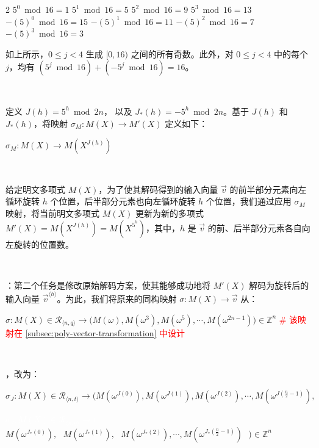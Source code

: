 \begin{multicols}{2}
\noindent $5^0 \bmod 16 = 1$
\newline $5^1 \bmod 16 = 5$
\newline $5^2 \bmod 16 = 9$
\newline $5^3 \bmod 16 = 13$
\newline $-(5)^0 \bmod 16 = 15$
\newline $-(5)^1 \bmod 16 = 11$
\newline $-(5)^2 \bmod 16 = 7$
\newline $-(5)^3 \bmod 16 = 3$
\end{multicols}


如上所示，$0 \leq j < 4$ 生成 $[0, 16)$ 之间的所有奇数。此外，对 $0 \leq j < 4$ 中的每个 $j$，均有 $(5^j \bmod 16) + (-5^j \bmod 16) = 16$。

$ $

定义 $J(h) = 5^h \bmod 2n$，\text{ } 以及 \text{ } $J_*(h) = -5^h \bmod 2n$。基于 $J(h)$ 和 $J_*(h)$，将映射 $\sigma_M : M(X) \rightarrow M'(X)$ 定义如下：

$\sigma_{M} : M(X) \rightarrow M(X^{J(h)})$

$ $

给定明文多项式 $M(X)$，为了使其解码得到的输入向量 $\vec{v}$ 的前半部分元素向左循环旋转 $h$ 个位置，后半部分元素也向左循环旋转 $h$ 个位置，我们通过应用 $\sigma_M$ 映射，将当前明文多项式 $M(X)$ 更新为新的多项式 $M'(X) = M(X^{J(h)}) = M(X^{5^h})$，其中，$h$ 是 $\vec{v}$ 的前、后半部分元素各自向左旋转的位置数。


$ $

：第二个任务是修改原始解码方案，使其能够成功地将 $M'(X)$ 解码为旋转后的输入向量 $\vec{v}^{\langle h \rangle}$。为此，我们将原来的同构映射 $\sigma : M(X) \longrightarrow \vec{v}$ 从：

$\sigma: M(X) \in \mathcal{R}_{\langle n, q \rangle} \longrightarrow  \bm{(}M(\omega), M(\omega^3),M(\omega^5), \cdots, M(\omega^{2n-1})\bm{)} \in \mathbb{Z}^n$ \textcolor{red}{ \text{ } \# 该映射在 \autoref{subsec:poly-vector-transformation} 中设计}

$ $

，改为：

$\sigma_J: M(X) \in \mathcal{R}_{\langle n, t \rangle} \longrightarrow  \bm{(}M(\omega^{J(0)}),M(\omega^{J(1)}),M(\omega^{J(2)}), \cdots, M(\omega^{J(\frac{n}{2} - 1)}), $

\textcolor{white}{$\sigma_J: M(X) \in \mathcal{R}_{\langle n, q \rangle} \longrightarrow  \bm{(}$} $M(\omega^{J_*(0)}), \text{ } M(\omega^{J_*(1)}), \text{ } M(\omega^{J_*(2)}), \cdots, M(\omega^{J_*(\frac{n}{2} - 1)}) \text{ } \bm{)} \in \mathbb{Z}^{n}$


